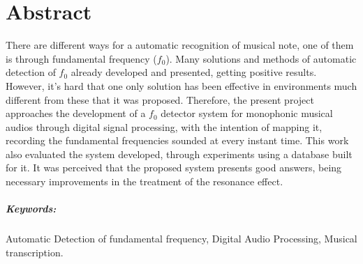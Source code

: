 \chapter*{Abstract}
\thispagestyle{empty}

There are different ways for a automatic recognition of musical note, one of them is through fundamental frequency ($f_0$). Many solutions and methods of automatic detection of $f_0$ already developed and presented, getting positive results. However, it's hard that one only solution has been effective in environments much different from these that it was proposed. Therefore, the present project approaches the development of a $f_0$ detector system for monophonic musical audios through digital signal processing, with the intention of mapping it, recording the fundamental frequencies sounded at every instant time. This work also evaluated the system developed, through experiments using a database built for it. It was perceived that the proposed system presents good answers, being necessary improvements in the treatment of the resonance effect.
\vspace{50pt}

\paragraph{Keywords:} Automatic Detection of fundamental frequency, Digital Audio Processing, Musical transcription.


